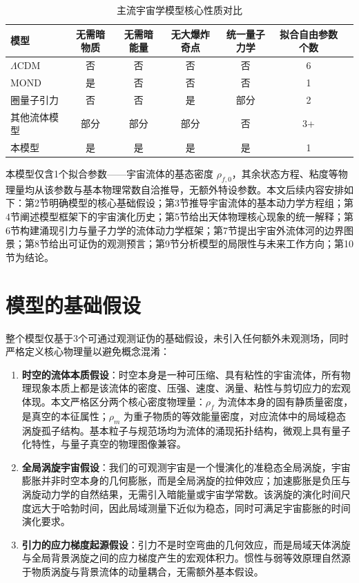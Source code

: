 \documentclass[aps,prd,preprint,superscriptaddress,floatfix]{revtex4-2}
\begin{document}
\begin{table}[h]
\centering
\caption{主流宇宙学模型核心性质对比}
\begin{tabular}{lcccccc}
\hline
模型 & 无需暗物质 & 无需暗能量 & 无大爆炸奇点 & 统一量子力学 & 拟合自由参数个数 \\
\hline
$\Lambda$CDM & 否 & 否 & 否 & 否 & 6 \\
MOND & 是 & 否 & 否 & 否 & 1 \\
圈量子引力 & 否 & 否 & 是 & 部分 & 2 \\
其他流体模型 & 部分 & 部分 & 部分 & 否 & 3+ \\
本模型 & 是 & 是 & 是 & 是 & 1 \\
\hline
\end{tabular}
\label{tab:model_compare}
\end{table}

本模型仅含1个拟合参数——宇宙流体的基态密度 $\rho_{f,0}$，其余状态方程、粘度等物理量均从该参数与基本物理常数自洽推导，无额外特设参数。本文后续内容安排如下：第2节明确模型的核心基础假设；第3节推导宇宙流体的基本动力学方程组；第4节阐述模型框架下的宇宙演化历史；第5节给出天体物理核心现象的统一解释；第6节构建涌现引力与量子力学的流体动力学框架；第7节提出宇宙外流体河的边界图景；第8节给出可证伪的观测预言；第9节分析模型的局限性与未来工作方向；第10节为结论。

\section{模型的基础假设}
整个模型仅基于3个可通过观测证伪的基础假设，未引入任何额外未观测场，同时严格定义核心物理量以避免概念混淆：
\begin{enumerate}
    \item \textbf{时空的流体本质假设}：时空本身是一种可压缩、具有粘性的宇宙流体，所有物理现象本质上都是该流体的密度、压强、速度、涡量、粘性与剪切应力的宏观体现。本文严格区分两个核心密度物理量：$\rho_{f}$ 为流体本身的固有静质量密度，是真空的本征属性；$\rho_{m}$ 为重子物质的等效能量密度，对应流体中的局域稳态涡旋孤子结构。基本粒子与规范场均为流体的涌现拓扑结构，微观上具有量子化特性，与量子真空的物理图像兼容。
    \item \textbf{全局涡旋宇宙假设}：我们的可观测宇宙是一个慢演化的准稳态全局涡旋，宇宙膨胀并非时空本身的几何膨胀，而是全局涡旋的拉伸效应；加速膨胀是负压与涡旋动力学的自然结果，无需引入暗能量或宇宙学常数。该涡旋的演化时间尺度远大于哈勃时间，因此局域测量下近似为稳态，同时可满足宇宙膨胀的时间演化要求。
    \item \textbf{引力的应力梯度起源假设}：引力不是时空弯曲的几何效应，而是局域天体涡旋与全局背景涡旋之间的应力梯度产生的宏观体积力。惯性与弱等效原理自然源于物质涡旋与背景流体的动量耦合，无需额外基本假设。
\end{enumerate}
\end{document}

